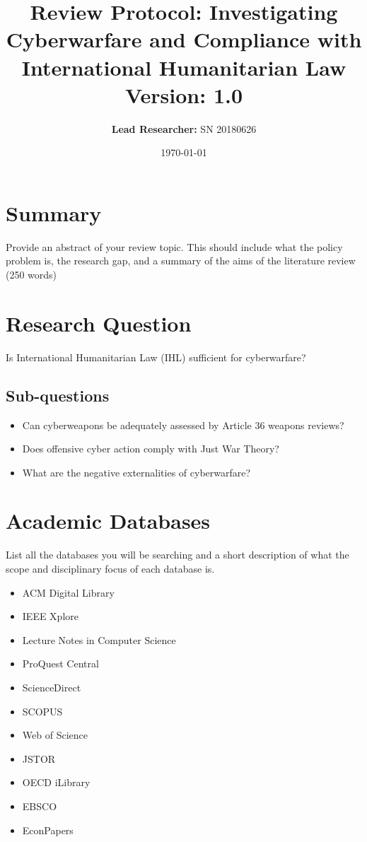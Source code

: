 \documentclass[a4paper,12pt]{article}
\title{\textbf{Review Protocol: Investigating Cyberwarfare and 
Compliance with International Humanitarian Law \\
\small{\textbf{Version:} 1.0}}}
\author{\textbf{Lead Researcher:} SN 20180626}
\date{\small{\today}}
\begin{document}
\maketitle

\section*{Summary}

\par Provide an abstract of your review topic. This should include 
what the policy problem is, the research gap, and a summary of the 
aims of the literature review (250 words)

\section*{Research Question}

\par Is International Humanitarian Law (IHL) sufficient for 
cyberwarfare?

\subsection*{Sub-questions}

\begin{itemize}
    \item Can cyberweapons be adequately assessed by Article 36 
weapons reviews?
    \item Does offensive cyber action comply with Just War Theory?
    \item What are the negative externalities of cyberwarfare?
\end{itemize}

\section*{Academic Databases}

\par List all the databases you will be searching and a short 
description of what the scope and disciplinary focus of each database 
is.

\begin{itemize}
    \item ACM Digital Library
    \item IEEE Xplore
    \item Lecture Notes in Computer Science
    \item ProQuest Central
    \item ScienceDirect
    \item SCOPUS
    \item Web of Science
    \item JSTOR
    \item OECD iLibrary
    \item EBSCO
    \item EconPapers
\end{itemize}
\end{document}
